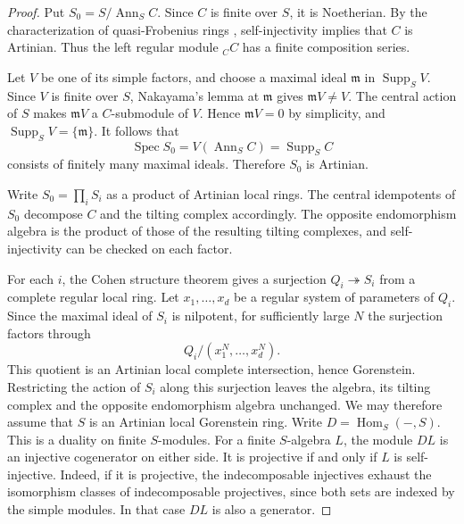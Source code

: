 \documentclass[12pt,a4paper,english,reqno]{amsart}
\numberwithin{equation}{section}
\theoremstyle{plain}
\theoremstyle{definition}
\begin{document}
\begin{proof}
Put $S_0=S/\operatorname{Ann}_S C$. Since $C$ is finite over $S$,
it is Noetherian. By the characterization of quasi-Frobenius rings
\cite[Theorem~15.1]{Lam1999ModulesRings}, self-injectivity implies
that $C$ is Artinian. Thus the left regular module ${}_CC$ has a
finite composition series.

Let $V$ be one of its simple factors, and choose a maximal ideal
$\mathfrak m$ in $\operatorname{Supp}_S V$. Since $V$ is finite over
$S$, Nakayama's lemma at $\mathfrak m$ gives $\mathfrak m V\ne V$.
The central action of $S$ makes $\mathfrak m V$ a $C$-submodule of
$V$. Hence $\mathfrak m V=0$ by simplicity, and
$\operatorname{Supp}_S V=\{\mathfrak m\}$. It follows that
\[
 \operatorname{Spec} S_0
 = V(\operatorname{Ann}_S C)
 = \operatorname{Supp}_S C
\]
consists of finitely many maximal ideals. Therefore $S_0$ is
Artinian.

Write $S_0=\prod_i S_i$ as a product of Artinian local rings.
The central idempotents of $S_0$ decompose $C$ and the tilting
complex accordingly. The opposite endomorphism algebra is the
product of those of the resulting tilting complexes, and
self-injectivity can be checked on each factor.

For each $i$, the Cohen structure theorem \cite{StacksCohen}
gives a surjection $Q_i\twoheadrightarrow S_i$ from a complete
regular local ring. Let $x_1,\ldots,x_d$ be a regular system of
parameters of $Q_i$. Since the maximal ideal of $S_i$ is
nilpotent, for sufficiently large $N$ the surjection factors
through
\[
 Q_i/(x_1^N,\ldots,x_d^N).
\]
This quotient is an Artinian local complete intersection, hence
Gorenstein. Restricting the action of $S_i$ along this surjection
leaves the algebra, its tilting complex and the opposite
endomorphism algebra unchanged. We may therefore assume that
$S$ is an Artinian local Gorenstein ring.
Write $D=\operatorname{Hom}_S(-,S)$. This is a duality on
finite $S$-modules. For a finite $S$-algebra $L$, the module
$DL$ is an injective cogenerator on either side. It is projective
if and only if $L$ is self-injective. Indeed, if it is projective,
the indecomposable injectives exhaust the isomorphism classes of
indecomposable projectives, since both sets are indexed by the
simple modules. In that case $DL$ is also a generator.


\end{proof}
\end{document}
